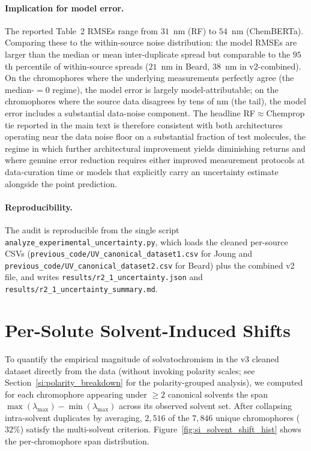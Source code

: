 \documentclass[journal=jcisd8,manuscript=suppinfo]{achemso}
\begin{document}
\paragraph{Implication for model error.}
The reported Table~2 RMSEs range from $31$~nm (RF) to $54$~nm (ChemBERTa). Comparing these to the within-source noise distribution: the model RMSEs are larger than the median or mean inter-duplicate spread but comparable to the $95$th percentile of within-source spreads ($21$~nm in Beard, $38$~nm in v2-combined). On the chromophores where the underlying measurements perfectly agree (the median-$=0$ regime), the model error is largely model-attributable; on the chromophores where the source data disagrees by tens of nm (the tail), the model error includes a substantial data-noise component. The headline RF$\approx$Chemprop tie reported in the main text is therefore consistent with both architectures operating near the data noise floor on a substantial fraction of test molecules, the regime in which further architectural improvement yields diminishing returns and where genuine error reduction requires either improved measurement protocols at data-curation time or models that explicitly carry an uncertainty estimate alongside the point prediction.

\paragraph{Reproducibility.}
The audit is reproducible from the single script \texttt{analyze\_experimental\_uncertainty.py}, which loads the cleaned per-source CSVs (\texttt{previous\_code/UV\_canonical\_dataset1.csv} for Joung and \texttt{previous\_code/UV\_canonical\_dataset2.csv} for Beard) plus the combined v2 file, and writes \texttt{results/r2\_1\_uncertainty.json} and \texttt{results/r2\_1\_uncertainty\_summary.md}.


\section{Per-Solute Solvent-Induced Shifts}
\label{si:solvent_shifts}

To quantify the empirical magnitude of solvatochromism in the v3 cleaned dataset directly from the data (without invoking polarity scales; see Section~\ref{si:polarity_breakdown} for the polarity-grouped analysis), we computed for each chromophore appearing under $\geq 2$ canonical solvents the span $\max(\lambda_{\max}) - \min(\lambda_{\max})$ across its observed solvent set. After collapsing intra-solvent duplicates by averaging, $2{,}516$ of the $7{,}846$ unique chromophores ($32$\%) satisfy the multi-solvent criterion. Figure~\ref{fig:si_solvent_shift_hist} shows the per-chromophore span distribution.
\end{document}
